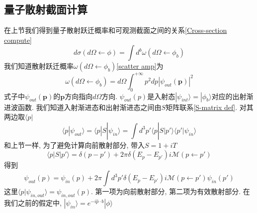 \documentclass[a4paper,11pt]{book}
\begin{document}
\subsection{量子散射截面计算}
在上节我们得到量子散射跃迁概率和可观测截面之间的关系\eqref{Cross-section compute}
\begin{equation}
  d\sigma(d\Omega\leftarrow\phi)=\int d^b\omega(d\Omega\leftarrow\phi_b)
\end{equation}
我们知道散射跃迁概率$\omega(d\Omega\leftarrow\phi_b)$\eqref{scatter amp}为
\begin{equation}\label{scatter omega}
  \omega(d\Omega\leftarrow\phi_b)=d\Omega\int_{0}^{+\infty}p^2dp|\psi_{out}(\mathbf{p})|^2
\end{equation}
式子中$\psi_{out}(\mathbf{p})$的$\mathbf{p}$方向指向$d\Omega$方向. $\psi_{out}(p)$是入射态$|\psi_{int}\rangle=|\phi_b\rangle$对应的出射渐进波函数. 我们知道入射渐进态和出射渐进态之间由$S$矩阵联系\ref{S-matrix def}. 对其两边取$\langle p|$
\begin{equation}
  \langle p|\psi_{out}\rangle=\langle p|S|\psi_{in}\rangle=\int d^3p'\langle p|S|p'\rangle\langle p'|\psi_{in}\rangle
\end{equation}
和上节一样, 为了避免计算向前散射部分, 带入$S=1+iT$
\begin{equation}
  \langle p|S|p'\rangle=\delta(p-p')+2\pi\delta(E_p-E_{p'})i\mathcal{M}(p\leftarrow p')
\end{equation}
得到
\begin{equation}\label{scatter amp equ}
  \psi_{out}(p)=\psi_{in}(p)+2\pi\int d^3p'\delta(E_p-E_{p'})i\mathcal{M}(p\leftarrow p')\psi_{in}(p')
\end{equation}
这里$\langle p|\psi_{in,out}\rangle=\psi_{in,out}(p)$. 第一项为向前散射部分, 第二项为有效散射部分. 在我们之前的假定中, $|\psi_{in}\rangle=e^{-i\hat{p}\cdot b}|\phi\rangle$
\end{document}
